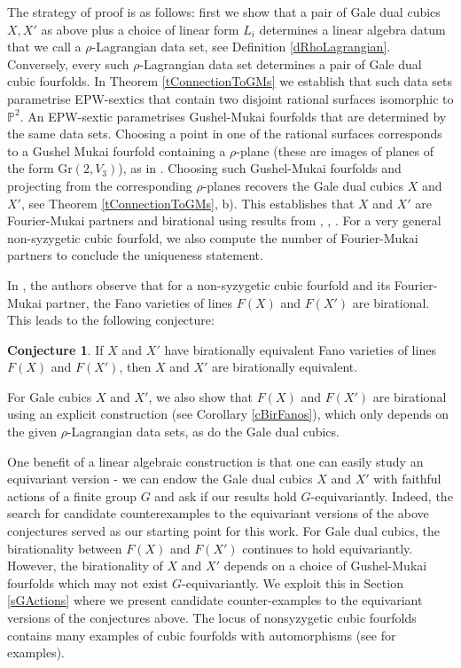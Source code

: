 \documentclass[11pt]{amsart}
\theoremstyle{plain}
\numberwithin{equation}{section}
\theoremstyle{definition}
\newtheorem{conjecture}[theorem]{Conjecture}
\theoremstyle{remark}
\newcommand{\bP}{\mathbb{P}}
\newcommand{\Gr}{\mathrm{Gr}}
\begin{document}
The strategy of proof is as follows: first we show that a pair of Gale dual cubics $X, X'$ as above plus a choice of linear form $L_i$ determines a linear algebra datum that we call a $\rho$-Lagrangian data set, see Definition \ref{dRhoLagrangian}. 
Conversely, every such $\rho$-Lagrangian data set determines a pair of Gale dual cubic fourfolds. 
In Theorem \ref{tConnectionToGMs} we establish that such data sets parametrise EPW-sextics that contain two disjoint rational surfaces isomorphic to $\bP^2$.
An EPW-sextic parametrises Gushel-Mukai fourfolds that are determined by the same data sets. Choosing a point in one of the rational surfaces corresponds to a Gushel Mukai fourfold containing a $\rho$-plane (these are images of planes of the form $\Gr(2,V_3)$), as in \cite{KuzPerry}. 
Choosing such Gushel-Mukai fourfolds and projecting from the corresponding $\rho$-planes recovers the Gale dual cubics $X$ and $X'$, see Theorem \ref{tConnectionToGMs}, b). 
This establishes that $X$ and $X'$ are Fourier-Mukai partners and birational using results from \cite{KuzPerry}, \cite{KuzPerryCatCones}, \cite{DK1}.
For a very general non-syzygetic cubic fourfold, we also compute the number of Fourier-Mukai partners to conclude the uniqueness statement.

In \cite{Brooke:2024aa}, the authors observe that for a non-syzygetic cubic fourfold and its Fourier-Mukai partner, the Fano varieties of lines $F(X)$ and $F(X')$ are birational. This leads to the following conjecture:

\begin{conjecture}\cite[Conjecture 1.2]{Brooke:2024aa} \label{conj: BFM}
If $X$ and $X'$ have birationally equivalent Fano varieties of lines $F(X)$ and $F(X')$, then $X$ and $X'$ are birationally equivalent. 
\end{conjecture}

For Gale cubics $X$ and $X'$, we also show that $F(X)$ and $F(X')$ are birational using an explicit construction (see Corollary \ref{cBirFanos}), which  only depends on the given $\rho$-Lagrangian data sets, as do the Gale dual cubics.

One benefit of a linear algebraic construction is that one can easily study an equivariant version - we can endow the Gale dual cubics $X$ and $X'$ with faithful actions of a finite group $G$ and ask if our results hold $G$-equivariantly. 
Indeed, the search for candidate counterexamples to the equivariant versions of the above conjectures served as our starting point for this work. 
For Gale dual cubics, the birationality between $F(X)$ and $F(X')$ continues to hold equivariantly. %
However, the birationality of $X$ and $X'$ depends on a choice of Gushel-Mukai fourfolds which may not exist $G$-equivariantly. We exploit this in Section \ref{sGActions} where we present candidate counter-examples to the equivariant versions of the conjectures above. 
The locus of nonsyzygetic cubic fourfolds contains many examples of cubic fourfolds with automorphisms (see \cite[Sect. 4]{BGM25} for examples). 
\end{document}
